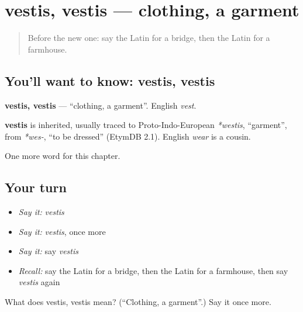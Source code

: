 \section[vestis, vestis]{vestis, vestis — clothing, a garment}

\label{lesson:LA-C108-vestis}



\begin{quote}
Before the new one: say the Latin for a bridge, then the Latin for a farmhouse.
\end{quote}

\subsection*{You'll want to know: vestis, vestis}
\textbf{vestis, vestis} — \textquotedblleft{}clothing, a garment\textquotedblright{}. English \emph{vest}.

\begin{cousinweb}
\textbf{vestis} is inherited, usually traced to Proto-Indo-European \emph{*westis}, \textquotedblleft{}garment\textquotedblright{}, from \emph{*wes-}, \textquotedblleft{}to be dressed\textquotedblright{} (EtymDB 2.1). English \emph{wear} is a cousin.
\end{cousinweb}

\begin{grammarlens}[title={What you've built}]
One more word for this chapter.
\end{grammarlens}

\subsection*{Your turn}
\begin{itemize}
\raggedright
  \item \emph{Say it:} \emph{vestis}
  \item \emph{Say it:} \emph{vestis}, once more
  \item \emph{Say it:} say \emph{vestis}
  \item \emph{Recall:} say the Latin for a bridge, then the Latin for a farmhouse, then say \emph{vestis} again
\end{itemize}

\begin{tcolorbox}[breakable,colback=teal!4,colframe=teal!35!black,title={Before you move on}]
What does vestis, vestis mean? (\textquotedblleft{}Clothing, a garment\textquotedblright{}.) Say it once more.
\end{tcolorbox}
